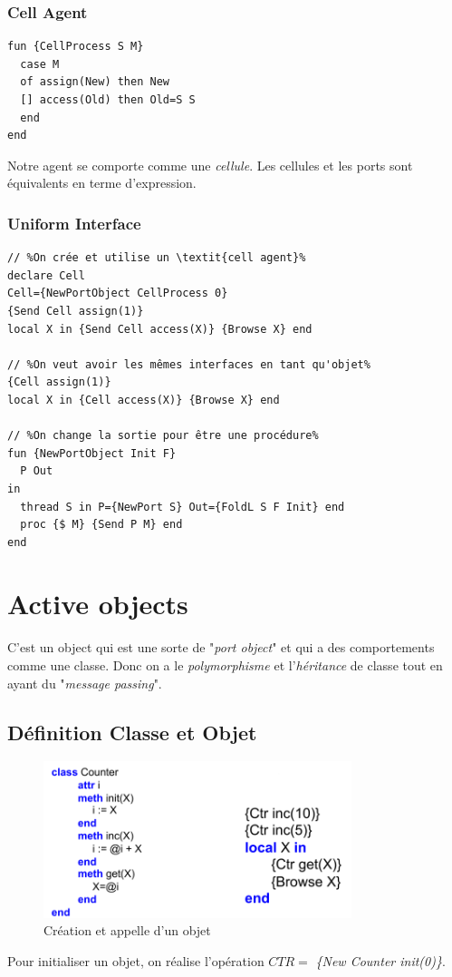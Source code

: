 \documentclass{report}
\begin{document}
\subsubsection{Cell Agent}
\begin{lstlisting}[escapechar=\%]
fun {CellProcess S M} 
  case M 
  of assign(New) then New 
  [] access(Old) then Old=S S 
  end
end
\end{lstlisting}
Notre agent se comporte comme une \textit{cellule}. Les cellules et les ports sont équivalents en terme d'expression.

\subsubsection{Uniform Interface}
\begin{lstlisting}[escapechar=\%]
// %On crée et utilise un \textit{cell agent}%
declare Cell 
Cell={NewPortObject CellProcess 0} 
{Send Cell assign(1)}
local X in {Send Cell access(X)} {Browse X} end

// %On veut avoir les mêmes interfaces en tant qu'objet%
{Cell assign(1)} 
local X in {Cell access(X)} {Browse X} end

// %On change la sortie pour être une procédure%
fun {NewPortObject Init F} 
  P Out
in
  thread S in P={NewPort S} Out={FoldL S F Init} end 
  proc {$ M} {Send P M} end
end
\end{lstlisting}

\section{Active objects}
C'est un object qui est une sorte de "\textit{port object}" et qui a des comportements comme une classe. Donc on a le \textit{polymorphisme} et l'\textit{héritance} de classe tout en ayant du "\textit{message passing}".

\subsection{Définition Classe et Objet}
\begin{figure}[H]
\centering
\includegraphics[width=9cm]{img/objet.png}
\caption{Création et appelle d'un objet}
\end{figure}
Pour initialiser un objet, on réalise l'opération $CTR=$ \textit{\{New Counter init(0)\}}.
\end{document}
